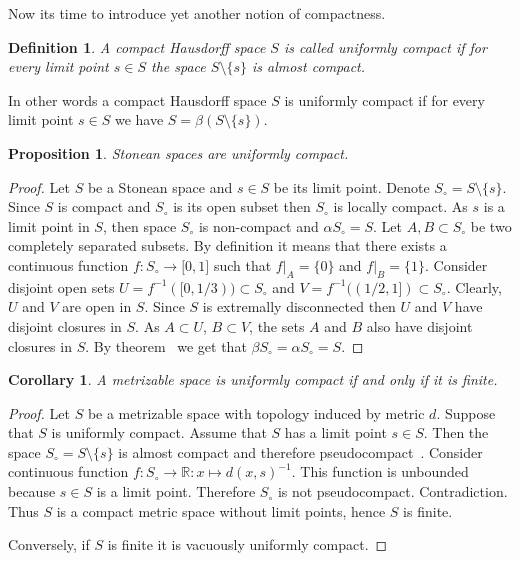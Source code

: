 \documentclass[12pt]{article}
\newtheorem{proposition}[theorem]{Proposition}
\newtheorem{corollary}[theorem]{Corollary}
\newtheorem{definition}[theorem]{Definition}
\begin{document}
Now its time to introduce yet another notion of compactness.

\begin{definition} A compact Hausdorff space $S$ is called uniformly compact if
    for every limit point $s\in S$ the space $S\setminus \{s\}$ is almost
    compact.
\end{definition}

In other words a compact Hausdorff space $S$ is uniformly compact if for every
limit point $s\in S$ we have $S=\beta(S\setminus \{s\})$.

\begin{proposition}\label{StoneSpUnifComp} Stonean spaces are uniformly compact.
\end{proposition}
\begin{proof} Let $S$ be a Stonean space and $s\in S$ be its limit point. Denote
    $S_\circ=S\setminus \{s\}$. Since $S$ is compact and $S_\circ$ is its open
    subset then $S_\circ$ is locally compact. As $s$ is a limit point in $S$,
    then space $S_\circ$ is non-compact and $\alpha S_\circ=S$. 
    Let $A,B\subset S_\circ$ be two completely separated subsets. 
    By definition it means that there exists a continuous 
    function $f:S_\circ\to\mathbb[0,1]$ such that
    $f|_A=\{0\}$ and $f|_B=\{1\}$. Consider disjoint open sets
    $U=f^{-1}([0,1/3))\subset S_\circ$ and  %
    $V=f^{-1}((1/2,1])\subset S_\circ$.  %
    Clearly, $U$ and $V$ are open in $S$. Since $S$ is extremally disconnected
    then $U$ and $V$ have disjoint closures in $S$. As $A\subset U$, $B\subset
        V$, the sets $A$ and $B$ also have disjoint closures in $S$. By
    theorem~\cite[theorem 3.6.2]{EngkingGenTop} we get that $\beta
        S_\circ=\alpha S_\circ=S$.
\end{proof}

\begin{corollary}\label{MesSpUnifCompIffFin} A metrizable space is uniformly
    compact if and only if it is finite.
\end{corollary}
\begin{proof} Let $S$ be a metrizable space with topology induced by metric $d$.
    Suppose that $S$ is uniformly compact. Assume that $S$ has a limit point
    $s\in S$. Then the space $S_\circ=S\setminus \{s\}$ is almost compact and
    therefore pseudocompact~\cite[proposition 1.3.10]{HrusPsdCompTopSp}.
    Consider continuous function $f:S_\circ\to\mathbb{R}:x\mapsto
        {d(x,s)}^{-1}$. This function is unbounded because $s\in S$ is a limit
    point. Therefore $S_\circ$ is not pseudocompact. Contradiction. Thus $S$ is
    a compact metric space without limit points, hence $S$ is finite.

    Conversely, if $S$ is finite it is vacuously uniformly compact.
\end{proof}
\end{document}
